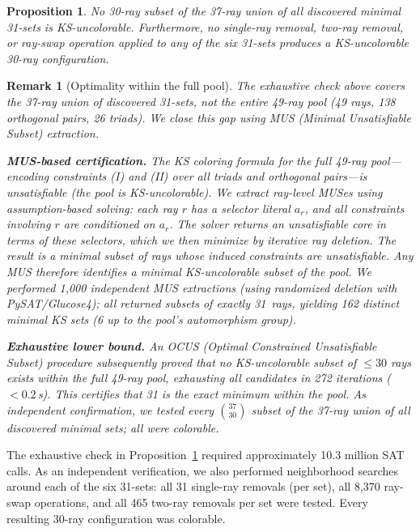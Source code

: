\documentclass[12pt,a4paper]{article}
\newtheorem{proposition}[theorem]{Proposition}
\newtheorem{remark}[theorem]{Remark}
\begin{document}
\begin{proposition}\label{prop:31optimal}
No 30-ray subset of the 37-ray union of all discovered minimal 31-sets is KS-uncolorable. Furthermore, no single-ray removal, two-ray removal, or ray-swap operation applied to any of the six 31-sets produces a KS-uncolorable 30-ray configuration.
\end{proposition}

\begin{remark}[Optimality within the full pool]\label{rem:ocus}
The exhaustive check above covers the 37-ray union of discovered 31-sets, not the entire 49-ray pool (49 rays, 138 orthogonal pairs, 26 triads).  We close this gap using MUS (Minimal Unsatisfiable Subset) extraction.

\smallskip\noindent\textbf{MUS-based certification.}  The KS coloring formula for the full 49-ray pool---encoding constraints (I) and (II) over all triads and orthogonal pairs---is unsatisfiable (the pool is KS-uncolorable).  We extract ray-level MUSes using assumption-based solving: each ray $r$ has a selector literal $a_r$, and all constraints involving $r$ are conditioned on $a_r$. The solver returns an unsatisfiable core in terms of these selectors, which we then minimize by iterative ray deletion. The result is a minimal subset of rays whose induced constraints are unsatisfiable.  Any MUS therefore identifies a \emph{minimal KS-uncolorable subset} of the pool.  We performed 1{,}000 independent MUS extractions (using randomized deletion with PySAT/Glucose4); all returned subsets of exactly 31~rays, yielding 162 distinct minimal KS sets (6 up to the pool's automorphism group).

\smallskip\noindent\textbf{Exhaustive lower bound.}  An OCUS (Optimal Constrained Unsatisfiable Subset) procedure subsequently proved that no KS-uncolorable subset of $\leq 30$ rays exists within the full 49-ray pool, exhausting all candidates in 272 iterations ($< 0.2$\,s).  This certifies that 31 is the exact minimum within the pool.  As independent confirmation, we tested every $\binom{37}{30}$ subset of the 37-ray union of all discovered minimal sets; all were colorable.
\end{remark}

The exhaustive check in Proposition~\ref{prop:31optimal} required approximately 10.3 million SAT calls. As an independent verification, we also performed neighborhood searches around each of the six 31-sets: all 31 single-ray removals (per set), all 8{,}370 ray-swap operations, and all 465 two-ray removals per set were tested. Every resulting 30-ray configuration was colorable.
\end{document}
